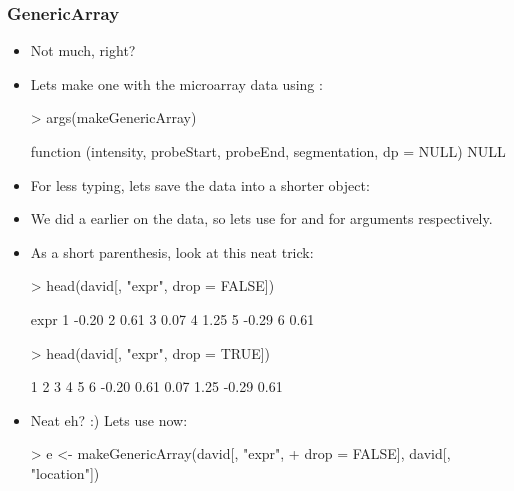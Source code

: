 \begin{frame}
  \frametitle{GenericArray}
  \begin{itemize}
  \item Not much, right?
  \item Lets make one with the microarray data using : \scriptsize
\begin{Schunk}
\begin{Sinput}
> args(makeGenericArray)
\end{Sinput}
\begin{Soutput}
function (intensity, probeStart, probeEnd, segmentation, dp = NULL) 
NULL
\end{Soutput}
\end{Schunk}
\normalsize
  \item For less typing, lets save the data into a shorter object:
\begin{Schunk}
\end{Schunk}
  \item We did a  earlier on the data, so lets use  for  and  for  arguments respectively.
  \item As a short parenthesis, look at this neat trick:
\begin{Schunk}
\begin{Sinput}
> head(david[, "expr", drop = FALSE])
\end{Sinput}
\begin{Soutput}
   expr
1 -0.20
2  0.61
3  0.07
4  1.25
5 -0.29
6  0.61
\end{Soutput}
\begin{Sinput}
> head(david[, "expr", drop = TRUE])
\end{Sinput}
\begin{Soutput}
    1     2     3     4     5     6 
-0.20  0.61  0.07  1.25 -0.29  0.61 
\end{Soutput}
\end{Schunk}
  \item Neat eh? :) Lets use  now:
\begin{Schunk}
\begin{Sinput}
> e <- makeGenericArray(david[, "expr", 
+     drop = FALSE], david[, "location"])
\end{Sinput}
\end{Schunk}
  \end{itemize}
\end{frame}

